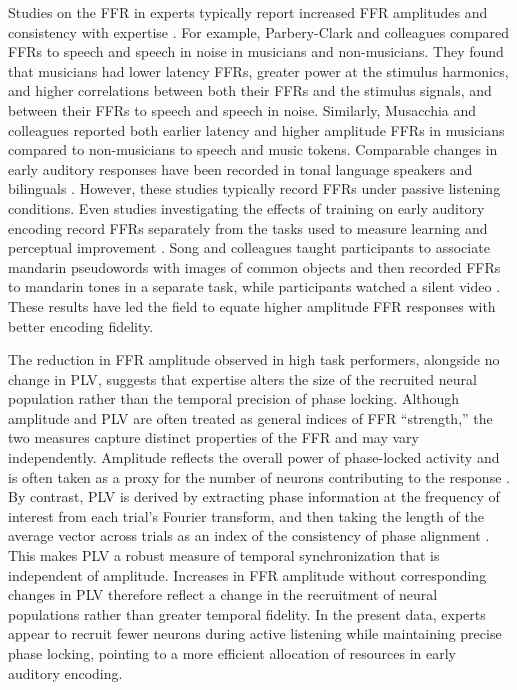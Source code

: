 \documentclass{article}
\begin{document}
Studies on the FFR in experts typically report increased FFR amplitudes and consistency with expertise \parencite{Strait_2009, Strait_2013, Wong_2007}. For example, Parbery-Clark and colleagues \parencite*{Parbery_Clark_2009} compared FFRs to speech and speech in noise in musicians and non-musicians. They found that musicians had lower latency FFRs, greater power at the stimulus harmonics, and higher correlations between both their FFRs and the stimulus signals, and between their FFRs to speech and speech in noise. Similarly, Musacchia and colleagues \parencite*{Musacchia_2008} reported both earlier latency and higher amplitude FFRs in musicians compared to non-musicians to speech and music tokens. Comparable changes in early auditory responses have been recorded in tonal language speakers \parencite{Jeng_2011, Krishnan_2005} and bilinguals \parencite{Krizman_2012, Krizman_2014, Krizman_2015, Skoe_2017, Omote_2017}. However, these studies typically record FFRs under passive listening conditions. Even studies investigating the effects of training on early auditory encoding record FFRs separately from the tasks used to measure learning and perceptual improvement \parencite{Russo_2005}. Song and colleagues taught participants to associate mandarin pseudowords with images of common objects and then recorded FFRs to mandarin tones in a separate task, while participants watched a silent video \parencite*{Song_2008}. These results have led the field to equate higher amplitude FFR responses with better encoding fidelity.

The reduction in FFR amplitude observed in high task performers, alongside no change in PLV, suggests that expertise alters the size of the recruited neural population rather than the temporal precision of phase locking. Although amplitude and PLV are often treated as general indices of FFR “strength,” the two measures capture distinct properties of the FFR and may vary independently. Amplitude reflects the overall power of phase-locked activity and is often taken as a proxy for the number of neurons contributing to the response \parencite{Luck_2014, Mitzdorf_1985}. By contrast, PLV is derived by extracting phase information at the frequency of interest from each trial’s Fourier transform, and then taking the length of the average vector across trials as an index of the consistency of phase alignment \parencite{Zhu_2013, Lachaux_1999}. This makes PLV a robust measure of temporal synchronization that is independent of amplitude. Increases in FFR amplitude without corresponding changes in PLV therefore reflect a change in the recruitment of neural populations rather than greater temporal fidelity. In the present data, experts appear to recruit fewer neurons during active listening while maintaining precise phase locking, pointing to a more efficient allocation of resources in early auditory encoding.
\end{document}
